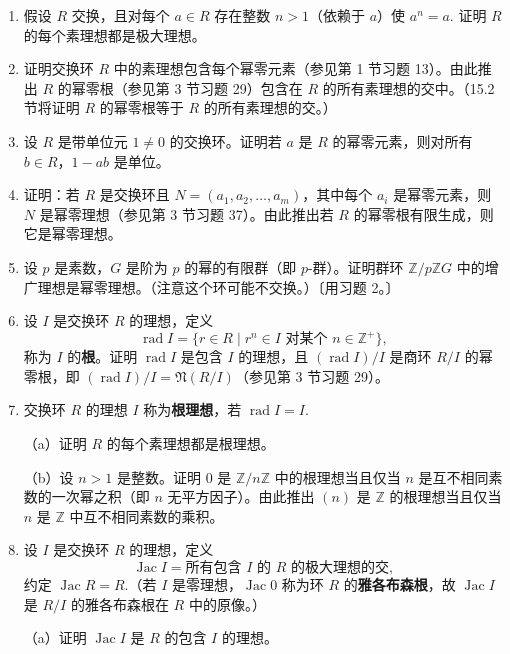 \begin{enumerate}
\item 假设 \(R\) 交换，且对每个 \(a \in R\) 存在整数 \(n > 1\)（依赖于 \(a\)）使 \(a^n = a\). 证明 \(R\) 的每个素理想都是极大理想。

\item 证明交换环 \(R\) 中的素理想包含每个幂零元素（参见第 1 节习题 13）。由此推出 \(R\) 的幂零根（参见第 3 节习题 29）包含在 \(R\) 的所有素理想的交中。（15.2 节将证明 \(R\) 的幂零根等于 \(R\) 的所有素理想的交。）

\item 设 \(R\) 是带单位元 \(1 \neq 0\) 的交换环。证明若 \(a\) 是 \(R\) 的幂零元素，则对所有 \(b \in R\)，\(1-ab\) 是单位。

\item 证明：若 \(R\) 是交换环且 \(N = (a_1, a_2, \ldots, a_m)\)，其中每个 \(a_i\) 是幂零元素，则 \(N\) 是幂零理想（参见第 3 节习题 37）。由此推出若 \(R\) 的幂零根有限生成，则它是幂零理想。

\item 设 \(p\) 是素数，\(G\) 是阶为 \(p\) 的幂的有限群（即 \(p\)-群）。证明群环 \(\mathbb{Z}/p\mathbb{Z}G\) 中的增广理想是幂零理想。（注意这个环可能不交换。）〔用习题 2。〕

\item 设 \(I\) 是交换环 \(R\) 的理想，定义
\[
\operatorname{rad} I = \{r \in R \mid r^n \in I \text{ 对某个 } n \in \mathbb{Z}^+\},
\]
称为 \(I\) 的\textbf{根}。证明 \(\operatorname{rad} I\) 是包含 \(I\) 的理想，且 \((\operatorname{rad} I)/I\) 是商环 \(R/I\) 的幂零根，即 \((\operatorname{rad} I)/I = \mathfrak{N}(R/I)\)（参见第 3 节习题 29）。

\item 交换环 \(R\) 的理想 \(I\) 称为\textbf{根理想}，若 \(\operatorname{rad} I = I\).

（a）证明 \(R\) 的每个素理想都是根理想。

（b）设 \(n > 1\) 是整数。证明 0 是 \(\mathbb{Z}/n\mathbb{Z}\) 中的根理想当且仅当 \(n\) 是互不相同素数的一次幂之积（即 \(n\) 无平方因子）。由此推出 \((n)\) 是 \(\mathbb{Z}\) 的根理想当且仅当 \(n\) 是 \(\mathbb{Z}\) 中互不相同素数的乘积。

\item 设 \(I\) 是交换环 \(R\) 的理想，定义
\[
\operatorname{Jac} I = \text{所有包含 } I \text{ 的 } R \text{ 的极大理想的交},
\]
约定 \(\operatorname{Jac} R = R\).（若 \(I\) 是零理想，\(\operatorname{Jac} 0\) 称为环 \(R\) 的\textbf{雅各布森根}，故 \(\operatorname{Jac} I\) 是 \(R/I\) 的雅各布森根在 \(R\) 中的原像。）

（a）证明 \(\operatorname{Jac} I\) 是 \(R\) 的包含 \(I\) 的理想。


\end{enumerate}
